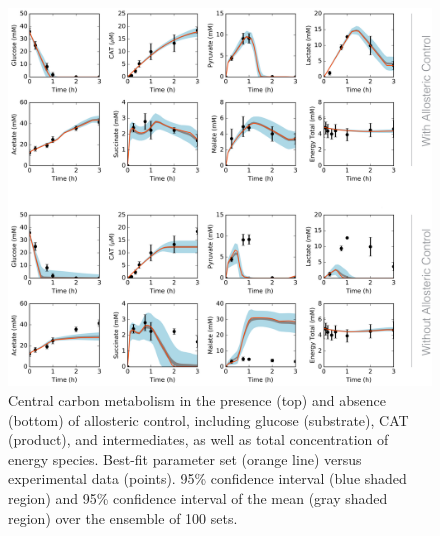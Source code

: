 \documentclass[12pt]{article}
\begin{document}
\begin{figure}[ht]
\centering
\includegraphics[width=1.00\textwidth]{./Figures/CarbonBoth_png.pdf}
\caption{Central carbon metabolism in the presence (top) and absence (bottom) of allosteric control, including glucose (substrate), CAT (product), and intermediates, as well as total concentration of energy species. Best-fit parameter set (orange line) versus experimental data (points). 95\% confidence interval (blue shaded region) and 95\% confidence interval of the mean (gray shaded region) over the ensemble of 100 sets.}
\label{fig:CarbonBoth_png}
\end{figure}
\end{document}
